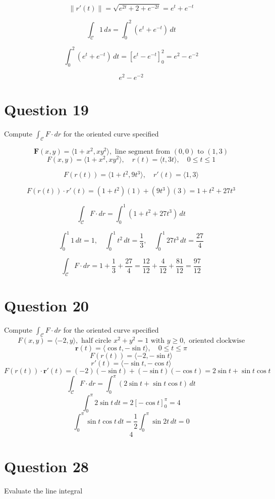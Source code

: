 \documentclass[hidelinks]{article}
\begin{document}
\[
\| r'(t) \| = \sqrt{e^{2t} + 2 + e^{-2t}} = e^t + e^{-t}
\]

\[
\int_\mathcal{C} 1 \, ds = \int_0^2 (e^t + e^{-t}) \, dt
\]

\[
\int_0^2 (e^t + e^{-t}) \, dt = \left[ e^t - e^{-t} \right]_0^2 = e^2 - e^{-2}
\]

\[
    e^2 - e^{-2}
\]
\newpage
\section*{Question 19}
Compute $\int_\mathcal{C} F \cdot dr$ for the oriented curve specified

\[
    \mathbf{F}(x,y) = \langle 1 + x^2, xy^2 \rangle, \text{ line segment from } (0,0) \text{ to } (1,3)
\]
\[
F(x, y) = \langle 1 + x^2, xy^2 \rangle, \quad r(t) = \langle t, 3t \rangle, \quad 0 \leq t \leq 1
\]

\[
F(r(t)) = \langle 1 + t^2, 9t^3 \rangle, \quad r'(t) = \langle 1, 3 \rangle
\]

\[
F(r(t)) \cdot r'(t) = (1 + t^2)(1) + (9t^3)(3) = 1 + t^2 + 27t^3
\]

\[
\int_\mathcal{C} F \cdot dr = \int_0^1 (1 + t^2 + 27t^3) \, dt
\]

\[
\int_0^1 1 \, dt = 1, \quad \int_0^1 t^2 \, dt = \frac{1}{3}, \quad \int_0^1 27t^3 \, dt = \frac{27}{4}
\]

\[
\int_\mathcal{C} F \cdot dr = 1 + \frac{1}{3} + \frac{27}{4} = \frac{12}{12} + \frac{4}{12} + \frac{81}{12} = \frac{97}{12}
\]
\newpage
\section*{Question 20}
Compute $\int_\mathcal{C} F \cdot dr$ for the oriented curve specified
\[
    F(x,y) = \langle -2, y \rangle, \text{ half circle } x^2+y^2 = 1 \text{ with } y \geq 0, \text{ oriented clockwise}
\]
\[
\mathbf{r}(t) = \langle \cos t, -\sin t \rangle, \quad 0 \leq t \leq \pi
\]
\[
F(r(t)) = \langle -2, -\sin t \rangle
\]
\[
r'(t) = \langle -\sin t, -\cos t \rangle
\]
\[
F(r(t)) \cdot \mathbf{r}'(t) = (-2)(-\sin t) + (-\sin t)(-\cos t) = 2\sin t + \sin t \cos t
\]
\[
\int_\mathcal{C} F \cdot dr = \int_0^\pi (2\sin t + \sin t \cos t) \, dt
\]
\[
\int_0^\pi 2\sin t \, dt = 2\left[ -\cos t \right]_0^\pi = 4
\]
\[
\int_0^\pi \sin t \cos t \, dt = \frac{1}{2} \int_0^\pi \sin 2t \, dt = 0
\]
\[
    4
\]
\newpage
\section*{Question 28}
Evaluate the line integral
\end{document}

